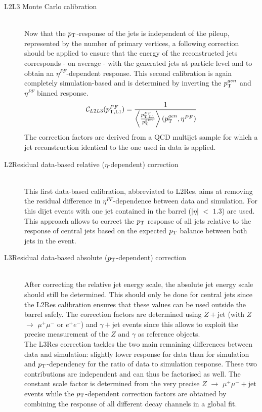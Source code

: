 \begin{myindentpar}
\begin{description}
    \item[L2L3 Monte Carlo calibration] \hfill \\
    Now that the $p_{\rm T}$-response of the jets is independent of the pileup, represented by the number of primary vertices, a following correction should be applied to ensure that the energy of the reconstructed jets corresponds - on average - with the generated jets at particle level and to obtain an $\eta^{PF}$-dependent response. This second calibration is again completely simulation-based and is determined by inverting the $p_{\rm T}^{gen}$ and $\eta^{PF}$ binned response.
    \begin{equation}
     \mathcal{C}_{L2L3}(p_{\rm T, L1}^{PF}) = \dfrac{1}{\left\langle \frac{p_{\rm T, L1}^{PF}}{p_{\rm T}^{gen}} \right\rangle \left(p_{\rm T}^{gen}, \eta^{PF} \right)}
    \end{equation}
    The correction factors are derived from a QCD multijet sample for which a jet reconstruction identical to the one used in data is applied.
    
    \item[L2Residual data-based relative ($\eta$-dependent) correction] \hfill \\
    This first data-based calibration, abbreviated to L2Res, aims at removing the residual difference in $\eta^{PF}$-dependence between data and simulation. For this dijet events with one jet contained in the barrel ($\vert \eta \vert$ $<$ $1.3$) are used. This approach allows to correct the $p_{\rm T}$ response of all jets relative to the response of central jets based on the expected $p_{\rm T}$ balance between both jets in the event.
        
    \item[L3Residual data-based absolute ($p_{\rm T}$-dependent) correction] \hfill \\
    After correcting the relative jet energy scale, the absolute jet energy scale should still be determined. This should only be done for central jets since the L2Res calibration ensures that these values can be used outside the barrel safely. 
    The correction factors are determined using $Z+$jet (with $Z$ $\rightarrow$ $\mu^{+}\mu^{-}$ or $e^{+}e^{-}$) and $\gamma+$jet events since this allows to exploit the precise measurement of the $Z$ and $\gamma$ as reference objects.
    \\
    The L3Res correction tackles the two main remaining differences between data and simulation: slightly lower response for data than for simulation and $p_{\rm T}$-dependency for the ratio of data to simulation response. These two contributions are independent and can thus be factorised as well. The constant scale factor is determined from the very precise $Z$ $\rightarrow$ $\mu^{+} \mu^{-}+$jet events while the $p_{\rm T}$-dependent correction factors are obtained by combining the response of all different decay channels in a global fit.
  \end{description}
\end{myindentpar}

